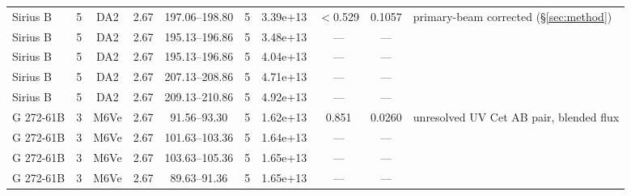 \documentclass{openjournal}
\begin{document}
\begin{table}
\begin{tabularx}{\textwidth}{@{}l c c c c c c c c X@{}}
Sirius B & 5 & DA2 & 2.67 & 197.06--198.80 & 5 & 3.39e+13 & $<$0.529 & 0.1057 & primary-beam corrected (\S\ref{sec:method}) \\
Sirius B & 5 & DA2 & 2.67 & 195.13--196.86 & 5 & 3.48e+13 & --- & --- &  \\
Sirius B & 5 & DA2 & 2.67 & 195.13--196.86 & 5 & 4.04e+13 & --- & --- &  \\
Sirius B & 5 & DA2 & 2.67 & 207.13--208.86 & 5 & 4.71e+13 & --- & --- &  \\
Sirius B & 5 & DA2 & 2.67 & 209.13--210.86 & 5 & 4.92e+13 & --- & --- &  \\
G 272-61B & 3 & M6Ve & 2.67 & 91.56--93.30 & 5 & 1.62e+13 & 0.851 & 0.0260 & unresolved UV Cet AB pair, blended flux \\
G 272-61B & 3 & M6Ve & 2.67 & 101.63--103.36 & 5 & 1.64e+13 & --- & --- &  \\
G 272-61B & 3 & M6Ve & 2.67 & 103.63--105.36 & 5 & 1.65e+13 & --- & --- &  \\
G 272-61B & 3 & M6Ve & 2.67 & 89.63--91.36 & 5 & 1.65e+13 & --- & --- &  \\
\hline
\end{tabularx}
\end{table}
\end{document}
